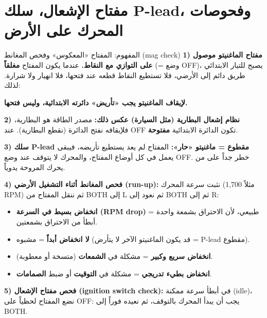 \documentclass[11pt,a4paper]{article}
\newcommand{\en}[1]{\textenglish{#1}}
\begin{document}
\newpage
\section{مفتاح الإشعال، سلك \en{P-lead}، وفحوصات المحرك على الأرض}

\begin{concept}{المفهوم: المفتاح «المعكوس» وفحص المغانط (\en{mag check})}
\textbf{1) مفتاح الماغنيتو موصول على التوازي مع النقاط.} عندما يكون المفتاح \textbf{مغلقاً} (= وضع \en{OFF})، يصبح للتيار الابتدائي طريق دائم إلى الأرضي، فلا تستطيع النقاط قطعه عند فتحها، فلا انهيار ولا شرارة. لذلك:
\begin{center}
\textbf{لإيقاف الماغنيتو يجب «تأريض» دائرته الابتدائية، وليس فتحها.}
\end{center}
\textbf{2) نظام إشعال البطارية (مثل السيارة) عكس ذلك:} مصدر الطاقة هو البطارية، فلإيقافه نفتح الدائرة (نقطع البطارية). عند \en{OFF} تكون الدائرة الابتدائية \textbf{مفتوحة}.

\textbf{3) سلك \en{P-lead} مقطوع = ماغنيتو «حار»:} المفتاح لم يعد يستطيع تأريضه، فيبقى يعمل في كل أوضاع المفتاح، والمحرك لا يتوقف عند وضع \en{OFF}. خطر جداً على من يحرك المروحة يدوياً.

\textbf{4) فحص المغانط أثناء التشغيل الأرضي (\en{run-up}):} نثبت سرعة المحرك (مثلاً 1,700 \en{RPM}) ثم ننقل المفتاح من \en{BOTH} إلى \en{L} ثم نعود إلى \en{BOTH} ثم إلى \en{R}:
\begin{itemize}
  \item \textbf{انخفاض بسيط في السرعة (\en{RPM drop})} = طبيعي، لأن الاحتراق بشمعة واحدة أبطأ من الاحتراق بشمعتين.
  \item \textbf{لا انخفاض أبداً} = مشبوه (قد يكون الماغنيتو الآخر لا يتأرض = \en{P-lead} مقطوع).
  \item \textbf{انخفاض سريع وكبير} = مشكلة في \textbf{الشمعات} (متسخة أو معطوبة).
  \item \textbf{انخفاض بطيء تدريجي} = مشكلة في \textbf{التوقيت} أو ضبط \textbf{الصمامات}.
\end{itemize}
\textbf{5) فحص مفتاح الإشعال (\en{ignition switch check}):} في أبطأ سرعة ممكنة (\en{idle})، نضع المفتاح لحظياً على \en{OFF}: يجب أن يبدأ المحرك بالتوقف، ثم نعيده فوراً إلى \en{BOTH}.
\end{concept}
\end{document}
